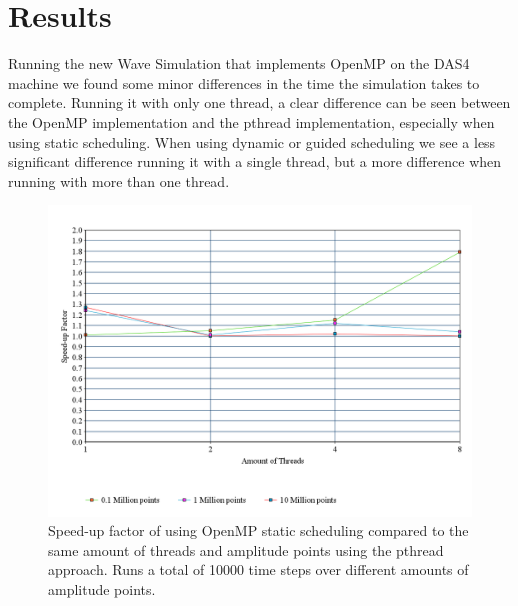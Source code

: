\documentclass[a4paper,12px]{article}
\begin{document}
\section{Results}

Running the new Wave Simulation that implements OpenMP on the DAS4 machine we
found some minor differences in the time the simulation takes to complete.
Running it with only one thread, a clear difference can be seen between the
OpenMP implementation and the pthread implementation, especially when using
static scheduling. When using dynamic or guided scheduling we see a less
significant difference running it with a single thread, but a more difference
when running with more than one thread.

\begin{figure}[H]
    \centering
    \includegraphics[width=\textwidth]{static}
    \caption{Speed-up factor of using OpenMP static scheduling compared to the
    same amount of threads and amplitude points using the pthread approach. Runs
    a total of 10000 time steps over different amounts of amplitude points.}
\end{figure}
\end{document}
